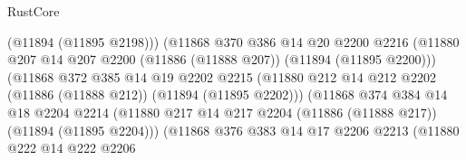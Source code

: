 \begin{lexlean}{RustCore}
\begin{coremodule}
                                    (@11894 (@11895 @2198)))
                                  (@11868
                                    @370
                                    @386
                                    @14
                                    @20
                                    @2200
                                    @2216
                                    (@11880
                                      @207
                                      @14
                                      @207
                                      @2200
                                      (@11886 (@11888 @207))
                                      (@11894 (@11895 @2200)))
                                    (@11868
                                      @372
                                      @385
                                      @14
                                      @19
                                      @2202
                                      @2215
                                      (@11880
                                        @212
                                        @14
                                        @212
                                        @2202
                                        (@11886 (@11888 @212))
                                        (@11894 (@11895 @2202)))
                                      (@11868
                                        @374
                                        @384
                                        @14
                                        @18
                                        @2204
                                        @2214
                                        (@11880
                                          @217
                                          @14
                                          @217
                                          @2204
                                          (@11886 (@11888 @217))
                                          (@11894 (@11895 @2204)))
                                        (@11868
                                          @376
                                          @383
                                          @14
                                          @17
                                          @2206
                                          @2213
                                          (@11880
                                            @222
                                            @14
                                            @222
                                            @2206

\end{coremodule}
\end{lexlean}
